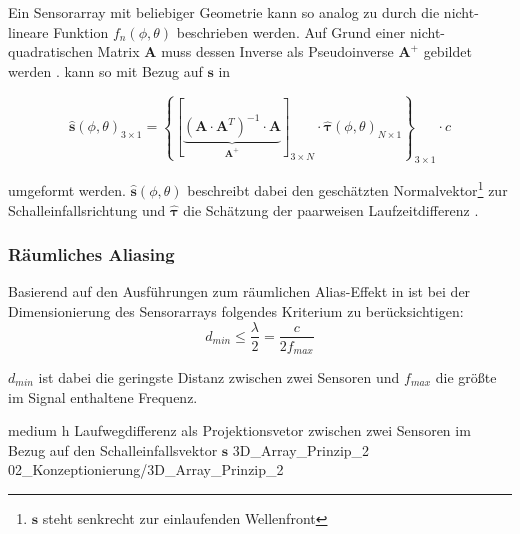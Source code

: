 Ein Sensorarray mit beliebiger Geometrie kann so analog zu  durch die nicht-lineare Funktion $f_n(\phi, \theta)$ beschrieben werden. Auf Grund einer nicht-quadratischen Matrix $\mathbf{A}$ muss dessen Inverse als Pseudoinverse $\textbf{A}^{+}$ gebildet werden \cite[S. 185]{Book_MatrixTheory_Piziak}.  kann so mit Bezug auf $\boldsymbol{s}$ in

\begin{equation}
        \boldsymbol{\hat s}(\phi, \theta)_{3 \times 1} = \left \{ \left [ \underbrace{\left( \textbf{A} \cdot \textbf{A}^T \right)^{-1} \cdot \textbf{A}}_{\textbf{A}^{+}}  \right]_{3 \times N} \cdot \boldsymbol{\hat \tau}(\phi, \theta)_{N \times 1} \right \}_{3 \times 1} \cdot c  
\end{equation}

umgeformt werden. $\boldsymbol{\hat s}(\phi, \theta)$ beschreibt dabei den geschätzten Normalvektor\footnote{$\boldsymbol{s}$ steht senkrecht zur einlaufenden Wellenfront} zur Schalleinfallsrichtung und $\boldsymbol{\hat \tau}$ die Schätzung der paarweisen Laufzeitdifferenz \cite[S. 71]{Master_Array_Varma}.
 
 
 
\subsubsection{Räumliches Aliasing} 
Basierend auf den Ausführungen zum räumlichen Alias-Effekt in \cite[8 f]{Master_Array_Pikora} ist bei der Dimensionierung des Sensorarrays folgendes Kriterium zu berücksichtigen:
 \begin{equation}\label{eq:raemlichesAliasing}
     d_{min} \leq \frac{\lambda}{2} = \frac{c}{2 f_{max}}
 \end{equation}

 $d_{min}$ ist dabei die geringste Distanz zwischen zwei Sensoren und $f_{max}$ die größte im Signal enthaltene Frequenz.
 

         {medium} %
         {h} %
         {Laufwegdifferenz als Projektionsvetor zwischen zwei Sensoren im Bezug auf den Schalleinfallsvektor $\mathbf{s}$} %
         {3D_Array_Prinzip_2} %
         {02_Konzeptionierung/3D_Array_Prinzip_2}






